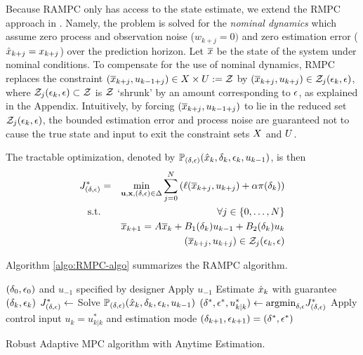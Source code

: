 Because RAMPC only has access to the state estimate, we extend the RMPC approach in \cite{richardsetal05rmp, chiscietal01swp}.
Namely, the problem is solved for the \emph{nominal dynamics} which assume zero process and observation noise ($w_{k+j} = 0)$ and zero estimation error ($\hat{x}_{k+j}=x_{k+j}$) over the prediction horizon.
Let $\overline{x}$ be the state of the system under nominal conditions.
To compensate for the use of nominal dynamics, RMPC replaces the constraint $(\overline{x}_{k+j},u_{k-1+j}) \in X \times U := \mathcal{Z}$ 
by $(\overline{x}_{k+j},u_{k+j}) \in \mathcal{Z}_{j}(\epsilon_k,\epsilon)$,
where $\mathcal{Z}_{j}(\epsilon_k,\epsilon) \subset \mathcal{Z}$ is $\mathcal{Z}$ `shrunk' by an amount corresponding to $\epsilon$, as explained in the Appendix.
Intuitively, by forcing $(\overline{x}_{k+j},u_{k-1+j})$ to lie in the reduced set $\mathcal{Z}_{j}(\epsilon_k,\epsilon)$, the bounded estimation error and process noise are guaranteed not to cause the true state and input to exit the constraint sets $X$ and $U$.

The tractable optimization, denoted by $\mathbb{P}_{(\delta,\epsilon)}(\hat{x}_{k},\delta_{k},\epsilon_{k},u_{k -1})$, is then 
\begin{eqnarray}
\label{eq:tractableOptim}
J^*_{(\delta,\epsilon)} &=& \min_{\mathbf{u},\mathbf{x},(\delta,\epsilon) \in \Delta}\sum_{j=0}^{N}\left(\ell(\overline{x}_{k+j},u_{k+j})+\alpha\pi(\delta_k)\right)
\\
\textrm{s.t.} &&\forall j \in \{0,\ldots,N\}
\nonumber
\\
&&\overline{x}_{k+1}=A \overline{x}_{k}+B_{1}(\delta_k)u_{k-1}+B_{2}(\delta_k)u_{k}
\nonumber
\\
&& (\overline{x}_{k+j},u_{k+j}) \in \mathcal{Z}_{j}(\epsilon_k,\epsilon)
\nonumber
\end{eqnarray}

Algorithm \ref{algo:RMPC-algo} summarizes the RAMPC algorithm.
\begin{algorithm}
	\begin{algorithmic}[1]
		\State $(\delta_{0},\epsilon_{0})$ and $u_{-1}$ specified by designer
		\State Apply $u_{-1}$
		\State Estimate $\hat{x}_{k}$ with guarantee $\left(\delta_k, \epsilon_k\right)$
		\State $J_{(\delta,\epsilon)}^* \leftarrow $ Solve $\mathbb{P}_{(\delta,\epsilon)}(\hat{x}_{k},\delta_{k},\epsilon_{k},u_{k -1})$		
		\EndFor
		\State $( \delta^{*}, \epsilon^{*}, u_{k | k}^{*} ) \gets \text{argmin}_{\delta,\epsilon} J_{(\delta,\epsilon)}^*$
		\State Apply control input $u_{k} = u_{k | k}^{*}$ and estimation mode $(\delta_{k+1},\epsilon_{k+1}) = \left( \delta^{*}, \epsilon^{*} \right)$
		\EndFor
	\end{algorithmic} 
	
	\caption{Robust Adaptive MPC algorithm with Anytime Estimation.}
	\label{algo:RMPC-algo}
\end{algorithm}

